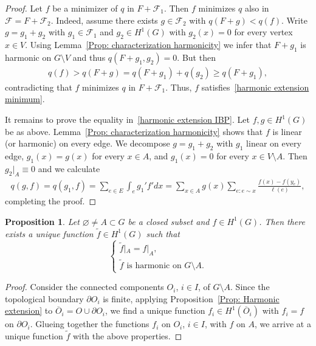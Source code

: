 \documentclass[reqno]{amsart}
\theoremstyle{plain}
\newtheorem{prop}[thm]{Proposition}
\theoremstyle{definition}
\theoremstyle{remark}
\numberwithin{equation}{section}
\begin{document}
\begin{proof}
Let $f$ be a minimizer of $q$ in $F+\mathcal{F}_1$. Then $f$ minimizes $q$ also in $\mathcal{F} = F+\mathcal{F}_2$. Indeed, assume there exists $g \in \mathcal{F}_2$ with $q(F+g) < q(f)$. Write $g=g_1 +g_2$ with $g_1 \in \mathcal{F}_1$ and $g_2 \in H^1(G)$ with $g_2(x) =0$ for every vertex $x \in V$. Using Lemma~\ref{Prop: characterization harmonicity} we infer that $F+g_1$ is harmonic on $G \setminus V$ and thus $q(F+g_1, g_2) = 0$.  
		But then		
	\begin{align*}
			q(f) > q(F+g) = q(F+g_1) + q(g_2) \geq q(F+g_1),
	\end{align*}
		contradicting that $f$ minimizes $q$ in $F+\mathcal{F}_1$. Thus, $f$ satisfies~\eqref{harmonic extension minimum}.

It remains to prove the equality in~\eqref{harmonic extension IBP}. Let $f, g \in H^1(G)$ be as above. Lemma~\ref{Prop: characterization harmonicity} shows that $f$ is linear (or harmonic) on every edge. We decompose $g=g_1+g_2$ with $g_1$ linear on every edge, $g_1(x)=g(x)$ for every $x \in A$, and $g_1(x)=0$ for every $x \in V \setminus A$. Then $g_2\big|_{A} \equiv 0$ and we calculate 
	\begin{align*}
		q(g,f) = q(g_1, f) = \sum_{e \in E} \int_{e} g_1' f' d x = \sum_{x \in A}g(x) \sum_{e: e \sim x } \frac{f(x) - f(y_e)}{\ell(e)},
	\end{align*}
completing the proof.
\end{proof}




\begin{prop}\label{Prop: Unique continuation}
			Let $\varnothing \neq A \subset G$ be a closed subset and $f \in H^1(G)$. Then there exists a unique function $\widetilde{f} \in H^1(G)$ such that
			\begin{equation} \label{eq: harm extension clsd set}
				\begin{cases}
				\widetilde{f}|_{A} = f|_{A}, \\
				\widetilde{f} \text{ is harmonic on } G \setminus A. 
			\end{cases}
			\end{equation}
\end{prop}
		
\begin{proof}
Consider the connected components $O_i$, $i \in I$, of $G \setminus A$. Since the topological boundary $\partial O_i$ is finite, applying Proposition~\ref{Prop: Harmonic extension} to $\overline O_i = O \cup \partial O_i$, we find a unique function $f_i \in H^1(\overline O_i)$ with $f_i = f$ on $\partial O_i$. Glueing together the functions $f_i$ on $O_i$, $i \in  I$, with $f$ on $A$, we arrive at a unique function $\widetilde{f}$ with the above properties.
\end{proof}
\end{document}
